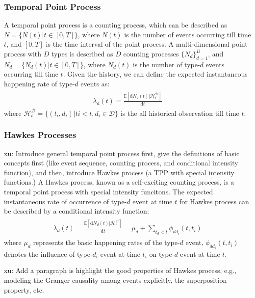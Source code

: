 \documentclass[runningheads]{llncs}
\newcommand{\dd}{\mathrm{d}}
\newcommand{\xu}[1]{{\color{red} xu: #1}}
\begin{document}
\subsubsection{Temporal Point Process} 
A temporal point process is a counting process, which can be described as $N = \{ N(t) | t \in [0, T] \}$, where $N(t)$ is the number of events occurring till time $t$, and $[0, T]$ is the time interval of the point process. A multi-dimensional point process with $D$ types is described as $D$ counting processes $\{N_d\}_{d=1}^D$, and $N_d = \{N_d(t) | t \in [0, T]\}$, where $N_d(t)$ is the number of type-$d$ events occurring till time $t$. Given the history, we can define the expected instantaneous happening rate of type-$d$ events as:
\begin{eqnarray}
\begin{aligned}
\lambda_d(t) = \frac{\mathbb{E}[\dd N_d(t)|\mathcal{H}_t^\mathcal{D}]}{\dd t}
\end{aligned}    
\end{eqnarray}
where $\mathcal{H}_t^\mathcal{D}=\{(t_i, d_i)| ti < t, d_i \in \mathcal{D}\}$ is the all historical observation till time $t$.


\subsubsection{Hawkes Processes} 
\xu{Introduce general temporal point process first, give the definitions of basic concepts first (like event sequence, counting process, and conditional intensity function), and then, introduce Hawkes process (a TPP with special intensity functions.)}
A Hawkes process, known as a self-exciting counting process, is a temporal point process with special intensity funcitons.
The expected instantaneous rate of occurrence of type-$d$ event at time $t$ for Hawkes process can be described by a conditional intensity function:
\begin{eqnarray}
\begin{aligned}
\lambda_d(t) = \frac{\mathbb{E}[\dd N_d(t)|\mathcal{H}_t^\mathcal{D}]}{\dd t} = \mu_d + \sum_{t_d < t} \phi_{dd_i} (t, t_i)
\end{aligned}    
\end{eqnarray}
where $\mu_d$ represents the basic happening rates of the type-$d$ event, $\phi_{dd_i} (t, t_i)$ denotes the influence of type-$d_i$ event at time $t_i$ on type-$d$ event at time $t$. 


\xu{Add a paragraph is highlight the good properties of Hawkes process, e.g., modeling the Granger causality among events explicitly, the superposition property, etc. }
\end{document}
